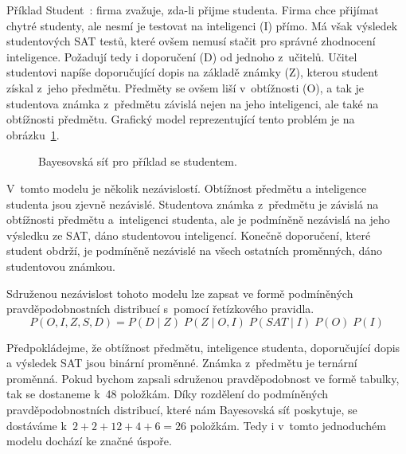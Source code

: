 Příklad Student~\cite{koller2009probabilistic}: firma zvažuje, zda-li přijme studenta.
Firma chce přijímat chytré studenty, ale nesmí je testovat na inteligenci (I) přímo.
Má však výsledek studentových SAT testů, které ovšem nemusí stačit pro správné zhodnocení inteligence.
Požadují tedy i doporučení (D) od jednoho z~učitelů.
Učitel studentovi napíše doporučující dopis na základě známky (Z), kterou student získal z~jeho předmětu.
Předměty se ovšem liší v~obtížnosti (O), a tak je studentova známka z~předmětu závislá nejen na jeho inteligenci, ale také na obtížnosti předmětu.
Grafický model reprezentující tento problém je na obrázku~\ref{fig:student}.
\begin{figure}
\begin{center}
\end{center}
\label{fig:student}
\caption{Bayesovská síť pro příklad se studentem.}
\end{figure}

V~tomto modelu je několik nezávislostí. Obtížnost předmětu a inteligence studenta jsou zjevně nezávislé.
Studentova známka z~předmětu je závislá na obtížnosti předmětu a~inteligenci studenta, ale je podmíněně nezávislá na jeho výsledku ze SAT, dáno studentovou inteligencí.
Konečně doporučení, které student obdrží, je podmíněně nezávislé na všech ostatních proměnných, dáno studentovou známkou.

Sdruženou nezávislost tohoto modelu lze zapsat ve formě podmíněných pravděpodobnostních distribucí s~pomocí řetízkového pravidla.
\begin{equation}
P(O, I, Z, S, D) = P(D \mid Z) \; P(Z\mid O, I) \; P(SAT \mid I) \; P(O) \; P(I)
\end{equation}

Předpokládejme, že obtížnost předmětu, inteligence studenta, doporučující dopis a výsledek SAT jsou binární proměnné.
Známka z~předmětu je ternární proměnná.
Pokud bychom zapsali sdruženou pravděpodobnost ve formě tabulky, tak se dostaneme k~48 položkám.
Díky rozdělení do podmíněných pravděpodobnostních distribucí, které nám Bayesovská síť poskytuje, se dostáváme k~$2 + 2 + 12 + 4 + 6 = 26$ položkám.
Tedy i v~tomto jednoduchém modelu dochází ke značné úspoře.

